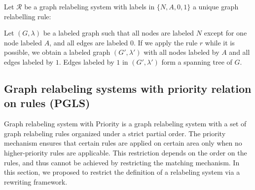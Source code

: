 \begin{example}
  \label{example:gls_spinning_tree}
  Let \(\mathcal{R}\) be a graph relabeling system with labels in \( \{N, A, 0, 1\}\) a unique graph relabelling rule:

  \begin{center}
  \end{center}

  Let \( (G, \lambda) \) be a labeled graph such that all nodes are labeled \(N\) except for one node labeled \(A\), and all edges are labeled \(0\). 
  If we apply the rule \(r\) while it is possible, we obtain a labeled graph \( (G', \lambda') \) with all nodes labeled by \(A\) and all edges labeled by \(1\). Edges labeled by \(1\) in \( (G', \lambda') \) form a spanning tree of \( G \). 
\end{example}


    \subsection{Graph relabeling systems with priority relation on rules (PGLS)}
    Graph relabeling system with Priority is a graph relabeling system with a set of graph relabeling rules organized under a strict partial order. The priority mechanism ensures that certain rules are applied on certain area only when no higher-priority rules are applicable. This restriction depends on the order on the rules, and thus cannot be achieved by restricting the matching mechanism. In this section, we proposed to restrict the definition of a relabeling system via a rewriting framework.

 

    \begin{definition}
    \end{definition}
    
